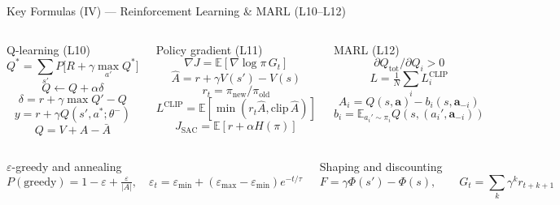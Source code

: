 \documentclass[aspectratio=169,10pt,t]{beamer}
\begin{document}
\begin{frame}{Key Formulas (IV) --- Reinforcement Learning \& MARL (L10--L12)}
\begin{columns}[T]
\begin{fbx}{Q-learning (L10)}\[Q^{*}=\sum_{s'}P\big[R+\gamma\max_{a'}Q^{*}\big]\]\[Q\leftarrow Q+\alpha\delta\]\[\delta=r+\gamma\max Q'-Q\]\[y=r+\gamma Q(s',a^{*};\theta^{-})\]\[Q=V+A-\bar A\]\end{fbx}
\begin{fbx}{Policy gradient (L11)}\[\nabla J=\mathbb E[\nabla\log\pi\,G_t]\]\[\hat A=r+\gamma V(s')-V(s)\]\[r_t=\pi_{\text{new}}/\pi_{\text{old}}\]\[L^{\text{CLIP}}=\mathbb E[\min(r_t\hat A,\text{clip}\,\hat A)]\]\[J_{\text{SAC}}=\mathbb E[r+\alpha H(\pi)]\]\end{fbx}
\begin{fbx}{MARL (L12)}\[\partial Q_{\text{tot}}/\partial Q_i>0\]\[L=\tfrac1N\sum_iL_i^{\text{CLIP}}\]\[A_i=Q(s,\mathbf a)-b_i(s,\mathbf a_{-i})\]\[b_i=\mathbb E_{a_i'\sim\pi_i}Q(s,(a_i',\mathbf a_{-i}))\]\end{fbx}
\end{columns}
\begin{columns}[T]
\begin{fbx}{$\varepsilon$-greedy and annealing}\[P(\text{greedy})=1-\varepsilon+\tfrac{\varepsilon}{|A|},\quad\varepsilon_t=\varepsilon_{\min}+(\varepsilon_{\max}-\varepsilon_{\min})e^{-t/\tau}\]\end{fbx}
\begin{fbx}{Shaping and discounting}\[F=\gamma\Phi(s')-\Phi(s),\qquad G_t=\sum_k\gamma^kr_{t+k+1}\]\end{fbx}
\end{columns}
\end{frame}
\end{document}
